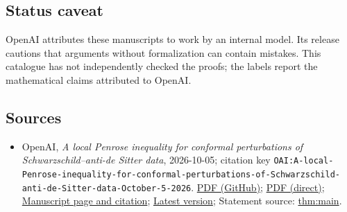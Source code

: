 \documentclass[11pt]{article}
\begin{document}
\subsection{Status caveat}
OpenAI attributes these manuscripts to work by an internal model. Its release cautions that arguments without formalization can contain mistakes. This catalogue has not independently checked the proofs; the labels report the mathematical claims attributed to OpenAI.

\subsection{Sources}
\begin{itemize}
\item OpenAI, \emph{A local Penrose inequality for conformal perturbations of Schwarzschild–anti-de Sitter data}, 2026-10-05; citation key \texttt{OAI:A-local-Penrose-inequality-for-conformal-perturbations-of-Schwarzschild-anti-de-Sitter-data-October-5-2026}. \href{https://github.com/openai/math/blob/adc7f1241b42e322a6451854ab7e4b4c146bf78a/preprints/A-local-Penrose-inequality-for-conformal-perturbations-of-Schwarzschild-anti-de-Sitter-data-October-5-2026/paper.pdf}{PDF (GitHub)}; \href{https://github.com/openai/math/raw/adc7f1241b42e322a6451854ab7e4b4c146bf78a/preprints/A-local-Penrose-inequality-for-conformal-perturbations-of-Schwarzschild-anti-de-Sitter-data-October-5-2026/paper.pdf}{PDF (direct)}; \href{https://github.com/openai/math/blob/adc7f1241b42e322a6451854ab7e4b4c146bf78a/preprints/A-local-Penrose-inequality-for-conformal-perturbations-of-Schwarzschild-anti-de-Sitter-data-October-5-2026/README.md}{Manuscript page and citation}; \href{https://github.com/openai/math/blob/main/preprints/A-local-Penrose-inequality-for-conformal-perturbations-of-Schwarzschild-anti-de-Sitter-data-October-5-2026/paper.pdf}{Latest version}; Statement source: \href{https://github.com/openai/math/blob/adc7f1241b42e322a6451854ab7e4b4c146bf78a/preprints/A-local-Penrose-inequality-for-conformal-perturbations-of-Schwarzschild-anti-de-Sitter-data-October-5-2026/build/sections/01-setting.tex\#L134}{thm:main}.

\end{itemize}
\end{document}

